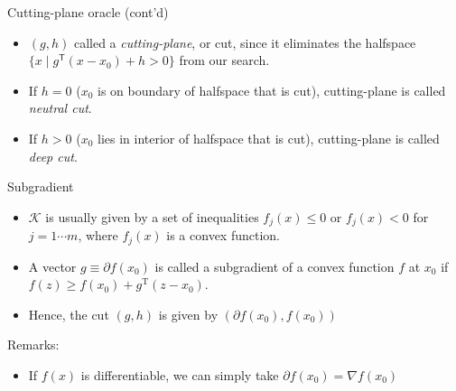\documentclass[10pt,ignorenonframetext,serif,onlymath]{beamer}
\providecommand{\tightlist}{%
  \setlength{\itemsep}{0pt}\setlength{\parskip}{0pt}}
\begin{document}
\begin{frame}{Cutting-plane oracle (cont’d)}
\protect\hypertarget{sec:cutting-plane-oracle-contd}{}

\begin{itemize}
\item
  \((g,h)\) called a \emph{cutting-plane}, or cut, since it eliminates
  the halfspace \(\{x \mid g^\mathsf{T} (x - x_0) + h > 0\}\) from our search.
\item
  If \(h=0\) (\(x_0\) is on boundary of halfspace that is cut),
  cutting-plane is called \emph{neutral cut}.
\item
  If \(h>0\) (\(x_0\) lies in interior of halfspace that is cut),
  cutting-plane is called \emph{deep cut}.
\end{itemize}

\end{frame}

\begin{frame}{Subgradient}
\protect\hypertarget{sec:subgradient}{}

\begin{itemize}
\tightlist
\item
  \(\mathcal{K}\) is usually given by a set of inequalities
  \(f_j(x) \le 0\) or \(f_j(x) < 0\) for \(j = 1 \cdots m\), where
  \(f_j(x)\) is a convex function.
\item
  A vector \(g \equiv \partial f(x_0)\) is called a subgradient of a
  convex function \(f\) at \(x_0\) if
  \(f(z) \geq f(x_0) + g^\mathrm{T} (z - x_0)\).
\item
  Hence, the cut \((g, h)\) is given by \((\partial f(x_0), f(x_0))\)
\end{itemize}

Remarks:

\begin{itemize}
\tightlist
\item
  If \(f(x)\) is differentiable, we can simply take
  \(\partial f(x_0) = \nabla f(x_0)\)
\end{itemize}

\end{frame}
\end{document}
